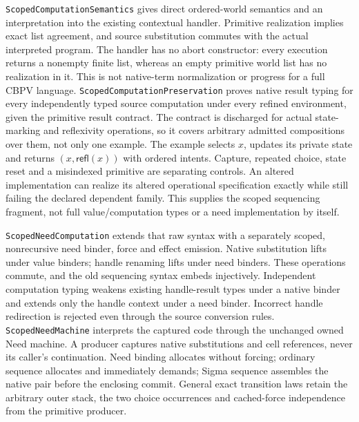 \documentclass[11pt]{article}
\theoremstyle{definition}
\theoremstyle{remark}
\begin{document}
\nolinkurl{ScopedComputationSemantics} gives direct ordered-world semantics
and an interpretation into the existing contextual handler. Primitive
realization implies exact list agreement, and source substitution commutes
with the actual interpreted program. The handler has no abort constructor:
every execution returns a nonempty finite list, whereas an empty primitive
world list has no realization in it. This is not native-term normalization
or progress for a full CBPV language.
\nolinkurl{ScopedComputationPreservation} proves native result typing for
every independently typed source computation under every refined environment,
given the primitive result contract. The contract is discharged for actual
state-marking and reflexivity operations, so it covers arbitrary admitted
compositions over them, not only one example. The example selects $x$, updates
its private state and returns $(x,\mathsf{refl}(x))$ with ordered intents.
Capture, repeated choice, state reset and a misindexed primitive are separating
controls. An altered implementation can realize its altered operational
specification exactly while still failing the declared dependent family.
This supplies the scoped sequencing fragment, not full value/computation
types or a need implementation by itself.

\nolinkurl{ScopedNeedComputation} extends that raw syntax with a separately
scoped, nonrecursive need binder, force and effect emission. Native
substitution lifts under value binders; handle renaming lifts under need
binders. These operations commute, and the old sequencing syntax embeds
injectively. Independent computation typing weakens existing handle-result
types under a native binder and extends only the handle context under a
need binder. Incorrect handle redirection is rejected even through the
source conversion rules.
\nolinkurl{ScopedNeedMachine} interprets the captured code through the
unchanged owned Need machine. A producer captures native substitutions and
cell references, never its caller's continuation. Need binding allocates
without forcing; ordinary sequence allocates and immediately demands;
Sigma sequence assembles the native pair before the enclosing commit.
General exact transition laws retain the arbitrary outer stack, the two
choice occurrences and cached-force independence from the primitive producer.
\end{document}
